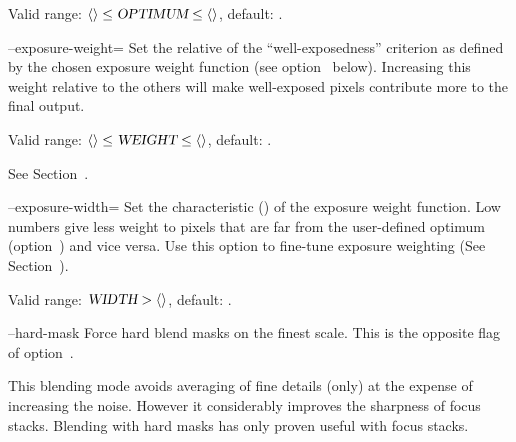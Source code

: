 \begin{codelist}
  Valid range: $\val{val:minimum-exposure-optimum} \leq \metavar{OPTIMUM} \leq
  \val{val:maximum-exposure-optimum}$, default: .


  \label{opt:exposure-weight}%
\item[--exposure-weight=\metavar{WEIGHT}]\itemend
  Set the relative  of the ``well-exposedness'' criterion as defined by the
  chosen exposure weight function (see
  option~
  below).  Increasing this weight relative to the others will make well-exposed pixels
  contribute more to the final output.

  Valid range: $\val{val:minimum-weight-exposure} \leq
  \metavar{WEIGHT} \leq \val{val:maximum-weight-exposure}$, default:
  .

  See Section~.


  \label{opt:exposure-width}%
\item[--exposure-width=\metavar{WIDTH}]\itemend
  Set the characteristic  () of the exposure weight function.  Low
  numbers give less weight to pixels that are far from the user-defined optimum
  (option~) and vice versa.  Use
  this option to fine-tune exposure weighting (See Section~).

  Valid range: $\metavar{WIDTH} > \val{val:minimum-exposure-width}$, default:
  .


  \label{opt:hard-mask}%
\item[--hard-mask]\itemend
  Force hard blend masks on the finest scale.  This is the opposite flag of
  option~.

  This blending mode avoids averaging of fine details (only) at the expense of increasing the
  noise.  However it considerably improves the sharpness of focus stacks.  Blending with hard
  masks has only proven useful with focus stacks.


\end{codelist}
